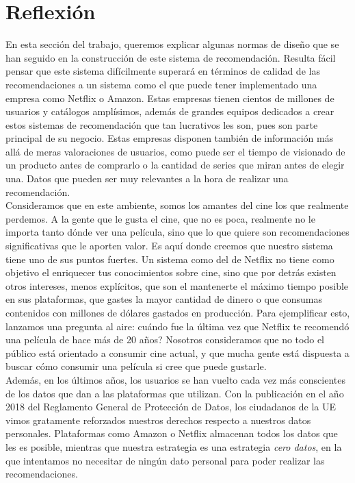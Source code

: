 \section{Reflexión}\label{sec:reflexion}

En esta sección del trabajo, queremos explicar algunas normas de diseño que se han seguido en la construcción de este sistema de recomendación. Resulta fácil pensar que este sistema difícilmente superará en términos de calidad de las recomendaciones a un sistema como el que puede tener implementado una empresa como Netflix o Amazon. Estas empresas tienen cientos de millones de usuarios y catálogos amplísimos, además de grandes equipos dedicados a crear estos sistemas de recomendación que tan lucrativos les son, pues son parte principal de su negocio. Estas empresas disponen también de información más allá de meras valoraciones de usuarios, como puede ser el tiempo de visionado de un producto antes de comprarlo o la cantidad de series que miran antes de elegir una. Datos que pueden ser muy relevantes a la hora de realizar una recomendación.\\

Consideramos que en este ambiente, somos los amantes del cine los que realmente perdemos. A la gente que le gusta el cine, que no es poca, realmente no le importa tanto dónde ver una película, sino que lo que quiere son recomendaciones significativas que le aporten valor. Es aquí donde creemos que nuestro sistema tiene uno de sus puntos fuertes. Un sistema como del de Netflix no tiene como objetivo el enriquecer tus conocimientos sobre cine, sino que por detrás existen otros intereses, menos explícitos, que son el mantenerte el máximo tiempo posible en sus plataformas, que gastes la mayor cantidad de dinero o que consumas contenidos con millones de dólares gastados en producción. Para ejemplificar esto, lanzamos una pregunta al aire: \textquestiondown cuándo fue la última vez que Netflix te recomendó una película de hace más de 20 años? Nosotros consideramos que no todo el público está orientado a consumir cine actual, y que mucha gente está dispuesta a buscar cómo consumir una película si cree que puede gustarle.\\

Además, en los últimos años, los usuarios se han vuelto cada vez más conscientes de los datos que dan a las plataformas que utilizan. Con la publicación en el año 2018 del Reglamento General de Protección de Datos, los ciudadanos de la UE vimos gratamente reforzados nuestros derechos respecto a nuestros datos personales. Plataformas como Amazon o Netflix almacenan todos los datos que les es posible, mientras que nuestra estrategia es una estrategia \textit{cero datos}, en la que intentamos no necesitar de ningún dato personal para poder realizar las recomendaciones.\\

